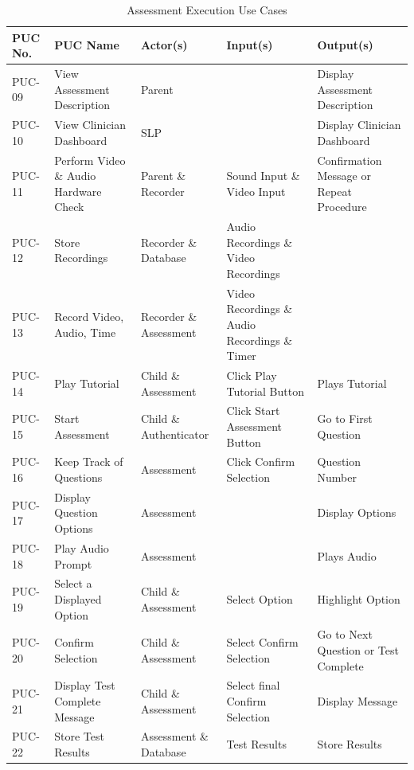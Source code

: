 \documentclass[12pt]{article}
\begin{document}
\begin{table}[H]
\centering
\caption{Assessment Execution Use Cases}
\label{tab:use_case_2}
\begin{tabular}{|p{2cm}|p{3.2cm}|p{3.2cm}|p{3cm}|p{3cm}|}
  \hline
  \textbf{PUC No.} & \textbf{PUC Name} & \textbf{Actor(s)} & \textbf{Input(s)} & \textbf{Output(s)} \\
  \hline
  PUC-09 & View Assessment Description & Parent & & Display Assessment Description \\  
  \hline
  PUC-10 & View Clinician Dashboard & SLP & & Display Clinician Dashboard \\  
  \hline
  PUC-11 & Perform Video \& Audio Hardware Check & Parent \& Recorder & Sound Input \& Video Input & Confirmation Message or Repeat Procedure \\  
  \hline
  PUC-12 & Store Recordings & Recorder \& Database & Audio Recordings \& Video Recordings & \\  
  \hline
  PUC-13 & Record Video, Audio, Time & Recorder \& Assessment & Video Recordings \& Audio Recordings \& Timer & \\  
  \hline
  PUC-14 & Play Tutorial & Child \& Assessment & Click Play Tutorial Button & Plays Tutorial \\  
  \hline
  PUC-15 & Start Assessment & Child \& Authenticator & Click Start Assessment Button & Go to First Question \\  
  \hline
  PUC-16 & Keep Track of Questions & Assessment & Click Confirm Selection & Question Number \\  
  \hline
  PUC-17 & Display Question Options & Assessment & & Display Options \\  
  \hline
  PUC-18 & Play Audio Prompt & Assessment & & Plays Audio \\  
  \hline
  PUC-19 & Select a Displayed Option & Child \& Assessment & Select Option & Highlight Option \\  
  \hline
  PUC-20 & Confirm Selection & Child \& Assessment & Select Confirm Selection & Go to Next Question or Test Complete \\  
  \hline
  PUC-21 & Display Test Complete Message & Child \& Assessment & Select final Confirm Selection & Display Message \\  
  \hline
  PUC-22 & Store Test Results & Assessment \& Database & Test Results & Store Results \\  
  \hline
\end{tabular}
\end{table}
\end{document}
